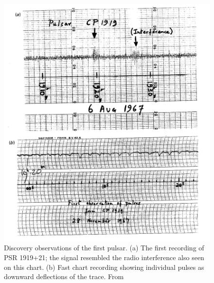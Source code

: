 \begin{figure}[htbp!] 
\centering    
\includegraphics[width=1.0\textwidth]{psr.JPG}
\caption[First detection of pulsar]{Discovery observations of the first pulsar. (a) The first recording of PSR 1919+21; the signal resembled the radio interference also seen on this chart. (b) Fast chart recording showing individual pulses as downward deflections of the trace. From \citet{hewish1964detection}}
\label{fig:psr}
\end{figure}

